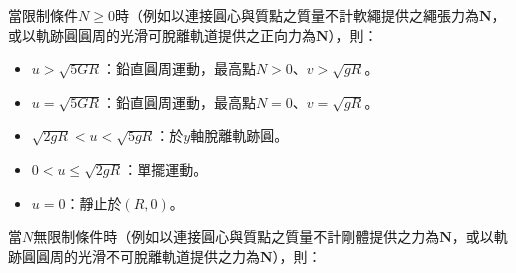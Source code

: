 \documentclass[a4paper,12pt]{article}
\begin{document}
當限制條件$N\geq 0$時（例如以連接圓心與質點之質量不計軟繩提供之繩張力為$\mathbf{N}$，或以軌跡圓圓周的光滑可脫離軌道提供之正向力為$\mathbf{N}$），則：
\begin{itemize}
\item $u>\sqrt{5GR}$：鉛直圓周運動，最高點$N>0$、$v>\sqrt{gR}$。
\item $u=\sqrt{5GR}$：鉛直圓周運動，最高點$N=0$、$v=\sqrt{gR}$。
\item $\sqrt{2gR}<u<\sqrt{5gR}$：於$y$軸脫離軌跡圓。
\item $0<u\leq\sqrt{2gR}$：單擺運動。
\item $u=0$：靜止於$(R,0)$。
\end{itemize}

當$N$無限制條件時（例如以連接圓心與質點之質量不計剛體提供之力為$\mathbf{N}$，或以軌跡圓圓周的光滑不可脫離軌道提供之力為$\mathbf{N}$），則：
\end{document}
